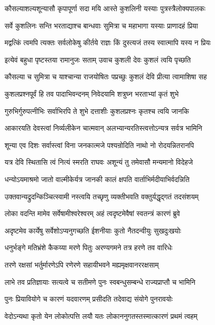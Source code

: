 \twolineshloka
{कौसल्याशल्यशून्यासौ कृपापूर्णा सदा मयि}
{आस्ते कुशलिनी यस्याः पुत्रस्त्रैलोक्यपालकः}%

\twolineshloka
{सर्वे कुशलिनः सन्ति भरताद्याश्च बान्धवाः}
{सुमित्रा च महाभागा यस्याः प्राणादहं प्रिया}%

\twolineshloka
{मद्वत्किं त्वमपि त्यक्तः सर्वलोकेषु कीर्तये}
{राज्ञः किं दुस्त्यजं तस्य स्वात्मापि यस्य न प्रियः}%

\twolineshloka
{इत्येवं बहुधा पृष्टस्तया रामानुजः सताम्}
{उवाच कुशली देवः कुशलं त्वयि पृच्छति}%

\twolineshloka
{कौसल्या च सुमित्रा च याश्चान्या राजयोषितः}
{पप्रच्छुः कुशलं देवि प्रीत्या त्वामाशिषा सह}%

\twolineshloka
{कुशलप्रश्नपूर्वं हि तव पादाभिवन्दनम्}
{निवेदयामि शत्रुघ्न भरताभ्यां कृतं शुभे}%

\twolineshloka
{गुरुभिर्गुरुपत्नीभिः सर्वाभिरपि ते शुभे}
{दत्ताशीः कुशलप्रश्नः कृतश्च त्वयि जानकि}%

\twolineshloka
{आकारयति देवस्त्वां निर्व्यलीकेन चात्मवान्}
{अलभ्यान्यरतिस्त्वत्तोऽन्यत्र सर्वत्र भामिनि}%

\twolineshloka
{शून्या एव दिशः सर्वास्त्वां विना जनकात्मजे}
{पश्यन्रोदिति नाथो नो रोदयन्नितरानपि}%

\twolineshloka
{यत्र देवि स्थितासि त्वं नित्यं स्मरति राघवः}
{अशून्यं तु तमेवासौ मन्यमानो विदेहजे}%

\twolineshloka
{धन्योऽयमाश्रमो जातो वाल्मीकेर्यत्र जानकी}
{कालं क्षपति वार्ताभिर्मदीयाभिर्वदन्निति}%

\twolineshloka
{उक्तवान्यद्रुदन्किञ्चित्स्वामी नस्त्वयि तच्छृणु}
{व्यक्तीभवति वक्तुर्यद्धृद्गतं तदसंशयम्}%

\twolineshloka
{लोका वदन्ति मामेव सर्वेषामीश्वरेश्वरम्}
{अहं त्वदृष्टमेवैषां स्वतन्त्रं कारणं ब्रुवे}%

\twolineshloka
{अदृष्टमेव कार्येषु सर्वेशोऽप्यनुगच्छति}
{ईशनीयाः कुतो नैतदन्वीयुः सुखदुःखयोः}%

\twolineshloka
{धनुर्भङ्गे मतिभ्रंशे कैकय्या मरणे पितुः}
{अरण्यगमने तत्र हरणे तव वारिधेः}%

\twolineshloka
{तरणे रक्षसां भर्तुर्मारणेऽपि रणेरणे}
{सहायीभवने मह्यमृक्षवानररक्षसाम्}%

\twolineshloka
{लाभे तव प्रतिज्ञायाः सत्यत्वे च सतीमणे}
{पुनः स्वबन्धुसम्बन्धे राज्यप्राप्तौ च भामिनि}%

\twolineshloka
{पुनः प्रियावियोगे च कारणं यदवारणम्}
{प्रसीदति तदेवाद्य संयोगे पुनरावयोः}%

\twolineshloka
{वेदोऽन्यथा कृतो येन लोकोत्पत्ति लयौ यतः}
{लोकाननुगतस्तस्मात्कारणं प्रथमं त्वहम्}%

